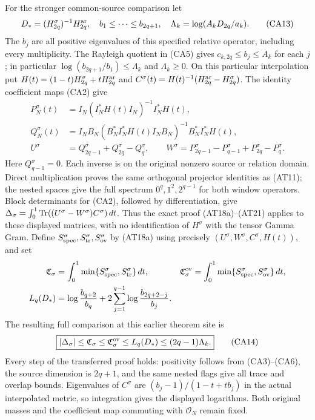For the stronger common-source comparison let
\[
 D_*=(H_{2q}^\sigma)^{-1}H_{2q}^{\rm ar},\quad
 b_1\le\cdots\le b_{2q+1},\quad
 \Lambda_k=\log(A_kD_{2q}/a_k).
 \tag{CA13}
\]
The $b_j$ are all positive eigenvalues of this specified relative
operator, including every multiplicity.  The Rayleigh quotient in
(CA5) gives $c_{k,2q}\le b_j\le A_k$ for each $j$; in particular
$\log(b_{2q+1}/b_1)\le\Lambda_k$ and $\Lambda_k\ge0$.
On this particular interpolation put $H(t)=(1-t)H_{2q}^\sigma
+tH_{2q}^{\rm ar}$ and $C^\sigma(t)=H(t)^{-1}(H_{2q}^{\rm ar}-H_{2q}^\sigma)$.
The identity coefficient maps (CA2) give
\[
\begin{aligned}
P_N^\sigma(t)&=I_N(I_N^*H(t)I_N)^{-1}I_N^*H(t),\\
Q_N^\sigma(t)&=I_NB_N(B_N^*I_N^*H(t)I_NB_N)^{-1}B_N^*I_N^*H(t),\\
U^\sigma&=Q_{2q-1}^\sigma+Q_{2q}^\sigma-Q_q^\sigma,\qquad
W^\sigma=P_{2q-1}^\sigma-P_{q-1}^\sigma+P_{2q}^\sigma-P_q^\sigma.
\end{aligned}\tag{CA14a}
\]
Here $Q_{q-1}^\sigma=0$. Each inverse is on the original nonzero
source or relation domain. Direct multiplication proves the same
orthogonal projector identities as (AT11); the nested spaces give
the full spectrum $0^q,1^2,2^{q-1}$ for both window operators.
Block determinants for (CA2), followed by differentiation, give
$\Delta_\sigma=\int_0^1\operatorname{Tr}((U^\sigma-W^\sigma)C^\sigma)\,dt$.
Thus the exact proof (AT18a)--(AT21) applies to these displayed
matrices, with no identification of $H^\sigma$ with the tensor
Gamma Gram. Define $S_{\rm spec}^\sigma,S_{\rm tr}^\sigma,
S_{\rm ov}^\sigma$ by (AT18a) using precisely
$(U^\sigma,W^\sigma,C^\sigma,H(t))$, and set
\[
\begin{aligned}
\mathfrak C_\sigma&=\int_0^1\min\{S_{\rm spec}^\sigma,S_{\rm tr}^\sigma\}\,dt,
&\mathfrak C_\sigma^{\rm ov}&=\int_0^1\min\{S_{\rm spec}^\sigma,S_{\rm ov}^\sigma\}\,dt,\\
L_q(D_*)&=\log\frac{b_{q+2}}{b_q}
 +2\sum_{j=1}^{q-1}\log\frac{b_{2q+2-j}}{b_j}.
\end{aligned}
\]
The resulting full comparison at this earlier theorem site is
\[
\boxed{|\Delta_\sigma|\le\mathfrak C_\sigma
 \le\mathfrak C_\sigma^{\rm ov}\le L_q(D_*)
 \le(2q-1)\Lambda_k.}\tag{CA14}
\]
Every step of the transferred proof holds: positivity follows from
(CA3)--(CA6), the source dimension is $2q+1$, and the same nested
flags give all trace and overlap bounds. Eigenvalues of $C^\sigma$
are $(b_j-1)/(1-t+tb_j)$ in the actual interpolated metric, so
integration gives the displayed logarithms. Both original masses
and the coefficient map commuting with $\mathcal O_N$ remain fixed.


